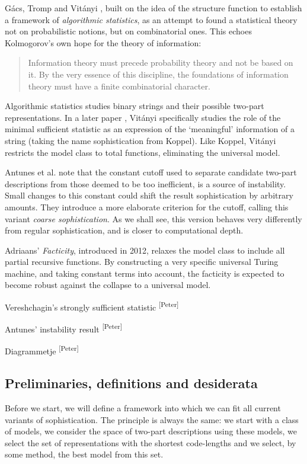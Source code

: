 \documentclass{style/llncs}
\newcommand{\pb}[1]{\textcolor{OliveGreen}{\small #1 \textsuperscript{[Peter]} }}
\begin{document}
G\'acs, Tromp and Vit\'anyi \cite{gacs2001algorithmic}, built on the idea of the structure function to establish a framework of \emph{algorithmic statistics}, as an attempt to found a statistical theory not on probabilistic notions, but on combinatorial ones. This echoes Kolmogorov's own hope for the theory of information:
\begin{quotation}
\noindent Information theory must precede probability theory and not be based on it. By the very essence of this discipline, the foundations of information theory must have a finite combinatorial character. \cite{kolmogorov1983combinatorial}
\end{quotation}
Algorithmic statistics studies binary strings and their possible two-part representations. In a later paper \cite{gacs2001algorithmic}, Vit\'anyi specifically studies the role of the minimal sufficient statistic as an expression of the `meaningful' information of a string (taking the name sophistication from Koppel). Like Koppel, Vit\'anyi restricts the model class to total functions, eliminating the universal model.

Antunes et al. \cite{antunes2009sophistication} note that the constant cutoff used to separate candidate two-part descriptions from those deemed to be too inefficient, is a source of instability. Small changes to this constant could shift the result sophistication by arbitrary amounts. They introduce a more elaborate criterion for the cutoff, calling this variant \emph{coarse sophistication}. As we shall see, this version behaves very differently from regular sophistication, and is closer to computational depth.
 
Adriaans' \emph{Facticity}, introduced in 2012\cite{adriaans2012facticity}, relaxes the model class to include all partial recursive functions. By constructing a very specific universal Turing machine, and taking constant terms into account, the facticity is expected to become robust against the collapse to a universal model.

\pb{Vereshchagin's strongly sufficient statistic} 

\pb{Antunes' instability result}

\pb{Diagrammetje}

\subsection{Preliminaries, definitions and desiderata}

Before we start, we will define a framework into which we can fit all current variants of sophistication. The principle is always the same: we start with a class of models, we consider the space of two-part descriptions using these models, we select the set of representations with the shortest code-lengths and we select, by some method, the best model from this set. 
\end{document}
